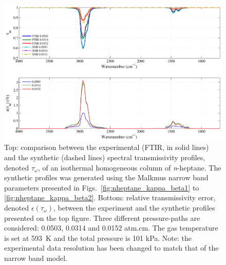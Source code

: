 \begin{figure}[p]
\includegraphics[width=\textwidth]{Figures/Comparison_Fit_Heptane_MALKMUS_Temp593K.pdf}
\caption{Top: comparison between the experimental (FTIR, in solid lines) and the synthetic (dashed lines) spectral transmissivity profiles, denoted $\tau_{\omega}$, of an isothermal homogeneous column of \textit{n}-heptane. The synthetic profiles was generated using the Malkmus narrow band parameters presented in Figs.~\ref{fig:nheptane_kappa_beta1} to \ref{fig:nheptane_kappa_beta2}. Bottom: relative transmissivity error, denoted $\epsilon{(\tau_{\omega})}$, between the experiment and the synthetic profiles presented on the top figure. Three different pressure-paths are considered: 0.0503, 0.0314 and 0.0152 atm.cm. The gas temperature is set at 593~K and the total pressure is 101 kPa. Note: the experimental data resolution has been changed to match that of the narrow band model. \label{fig:nheptane_SNBVerify_593K}}
\end{figure}

